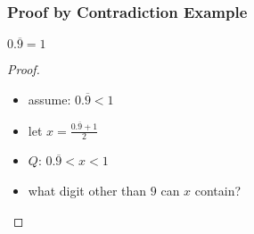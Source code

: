 \documentclass[dvipsnames]{beamer}
\begin{document}
\begin{frame}
  \frametitle{Proof by Contradiction Example}

  \begin{theorem}
    $0.\overline{9} = 1$
  \end{theorem}

  \pause
  \begin{proof}
    \begin{itemize}
      \item assume: $0.\overline{9} < 1$
      \item let $x = \frac{0.\overline{9} + 1}{2}$
      \item $Q$: $0.\overline{9} < x < 1$
      \item what digit other than $9$ can $x$ contain?
    \end{itemize}
  \end{proof}
\end{frame}
%
%
%
%
%
%
%
%
%
\end{document}

